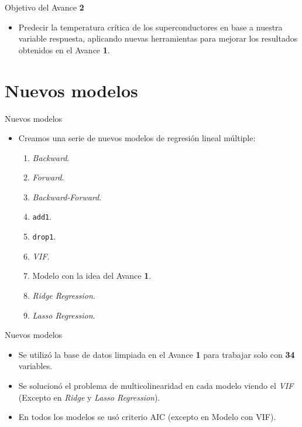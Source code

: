 \documentclass[11pt]{beamer}
\newcommand{\cod}[1]{\texttt{\frenchspacing#1}}
\begin{document}
\begin{frame}{Objetivo del Avance \textbf{2}}
	\begin{itemize}
		\item Predecir la temperatura crítica de los superconductores en base a nuestra variable respuesta, aplicando nuevas herramientas para mejorar los resultados obtenidos en el Avance \textbf{1}.
	\end{itemize}
\end{frame}


\section{Nuevos modelos}

\begin{frame}{Nuevos modelos}
	\begin{itemize}
		\item Creamos una serie de nuevos modelos de regresión lineal múltiple:
		\begin{enumerate}
			\item \textit{Backward}.
			\pause
			\item \textit{Forward}.
			\pause
			\item \textit{Backward-Forward}.
			\pause
			\item \cod{add1}.
			\pause
			\item \cod{drop1}.
			\pause
			\item \textit{VIF}.
			\pause
			\item Modelo con la idea del Avance \textbf{1}.
			\pause
			\item \textit{Ridge Regression}.
			\pause
			\item \textit{Lasso Regression}.
		\end{enumerate}
	\end{itemize}
\end{frame}

\begin{frame}{Nuevos modelos}
	\begin{itemize}
		\item Se utilizó la base de datos limpiada en el Avance \textbf{1} para trabajar solo con \textbf{34} variables.
		\pause
		\item Se solucionó el problema de multicolinearidad en cada modelo viendo el \textit{VIF} (Excepto en \textit{Ridge} y \textit{Lasso Regression}).
		\pause
		\item En todos los modelos se usó criterio AIC (excepto en Modelo con VIF).
	\end{itemize}
\end{frame}
\end{document}
